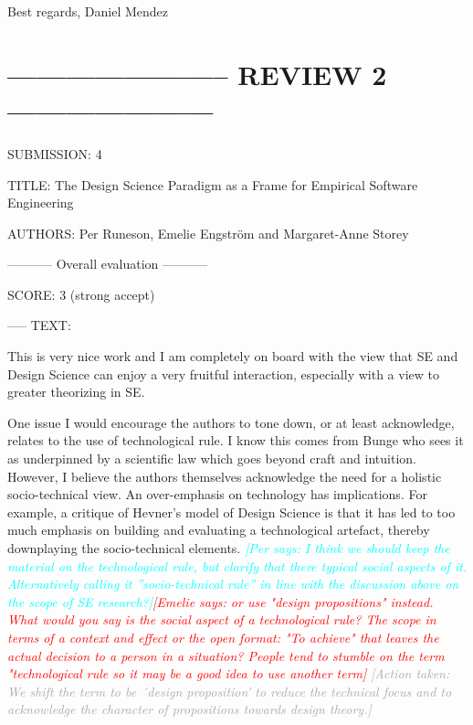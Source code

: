 \documentclass{article}
\newcommand{\emelie}[1]{\textcolor{red}{{\it [Emelie says: #1]}}}
\newcommand{\per}[1]{\textcolor{cyan}{{\it [Per says: #1]}}}
\newcommand{\action}[1]{\textcolor{darkgray}{{\it [Action taken: #1]}}}
\newcommand{\emelie}[1]{}
\newcommand{\per}[1]{}
\newcommand{\action}[1]{}
\begin{document}
Best regards, 
Daniel Mendez



\section*{----------------------- REVIEW 2 ---------------------}
SUBMISSION: 4

TITLE: The Design Science Paradigm as a Frame for Empirical Software Engineering

AUTHORS: Per Runeson, Emelie Engström and Margaret-Anne Storey

----------- Overall evaluation -----------

SCORE: 3 (strong accept)

----- TEXT:

This is very nice work and I am completely on board with the view that SE and Design Science can enjoy a very fruitful interaction, especially with a view to greater theorizing in SE.


One issue I would encourage the authors to tone down, or at least acknowledge, relates to the use of technological rule. I know this comes from Bunge who sees it as underpinned by a scientific law which goes beyond craft and intuition. However, I believe the authors themselves acknowledge the need for a holistic socio-technical view. An over-emphasis on technology has implications. For example, a critique of Hevner’s model of Design Science is that it has led to too much emphasis on building and evaluating a technological artefact, thereby downplaying the socio-technical elements. \per{I think we should keep the material on the technological rule, but clarify that there typical social aspects of it. Alternatively calling it ''socio-technical rule'' in line with the discussion above on the scope of SE research?}\emelie{or use "design propositions" instead. What would you say is the social aspect of a technological rule? The scope in terms of a context and effect or the open format: "To achieve" that leaves the actual decision to a person in a situation? People tend to stumble on the term "technological rule so it may be a good idea to use another term}
\action{We shift the term to be ´design proposition' to reduce the technical focus and to acknowledge the character of propositions towards design theory.}
\end{document}
